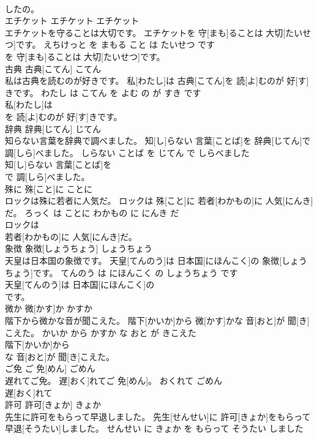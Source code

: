 \documentclass[8pt]{extreport}
\begin{document}
\begin{CJK}{UTF8}{min}
\\	したの。			
\\	エチケット	エチケット	エチケット	
\\	エチケットを守ることは大切です。	エチケットを 守[まも]ることは 大切[たいせつ]です。	えちけっと を まもる こと は たいせつ です	
\\	を 守[まも]ることは 大切[たいせつ]です。			
\\	古典	古典[こてん]	こてん	
\\	私は古典を読むのが好きです。	私[わたし]は 古典[こてん]を 読[よ]むのが 好[す]きです。	わたし は こてん を よむ の が すき です	
\\	私[わたし]は
\\	を 読[よ]むのが 好[す]きです。			
\\	辞典	辞典[じてん]	じてん	
\\	知らない言葉を辞典で調べました。	知[し]らない 言葉[ことば]を 辞典[じてん]で 調[しら]べました。	しらない ことば を じてん で しらべました	
\\	知[し]らない 言葉[ことば]を
\\	で 調[しら]べました。			
\\	殊に	殊[こと]に	ことに	
\\	ロックは殊に若者に人気だ。	ロックは 殊[こと]に 若者[わかもの]に 人気[にんき]だ。	ろっく は ことに わかもの に にんき だ	
\\	ロックは
\\	若者[わかもの]に 人気[にんき]だ。			
\\	象徴	象徴[しょうちょう]	しょうちょう	
\\	天皇は日本国の象徴です。	天皇[てんのう]は 日本国[にほんこく]の 象徴[しょうちょう]です。	てんのう は にほんこく の しょうちょう です	
\\	天皇[てんのう]は 日本国[にほんこく]の
\\	です。			
\\	微か	微[かす]か	かすか	
\\	階下から微かな音が聞こえた。	階下[かいか]から 微[かす]かな 音[おと]が 聞[き]こえた。	かいか から かすか な おと が きこえた	
\\	階下[かいか]から
\\	な 音[おと]が 聞[き]こえた。			
\\	ご免	ご 免[めん]	ごめん	
\\	遅れてご免。	遅[おく]れてご 免[めん]。	おくれて ごめん	
\\	遅[おく]れて
\\	許可	許可[きょか]	きょか	
\\	先生に許可をもらって早退しました。	先生[せんせい]に 許可[きょか]をもらって 早退[そうたい]しました。	せんせい に きょか を もらって そうたい しました	

\end{CJK}
\end{document}
